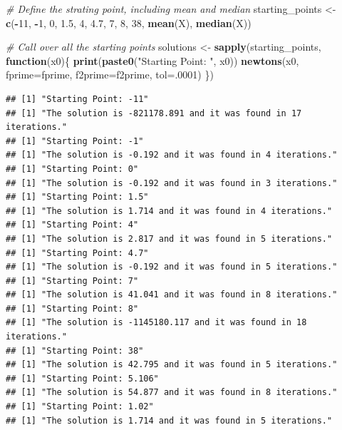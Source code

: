 \documentclass[]{article}
\newenvironment{Shaded}{\begin{snugshade}}{\end{snugshade}}
\newcommand{\KeywordTok}[1]{\textcolor[rgb]{0.13,0.29,0.53}{\textbf{#1}}}
\newcommand{\DataTypeTok}[1]{\textcolor[rgb]{0.13,0.29,0.53}{#1}}
\newcommand{\DecValTok}[1]{\textcolor[rgb]{0.00,0.00,0.81}{#1}}
\newcommand{\FloatTok}[1]{\textcolor[rgb]{0.00,0.00,0.81}{#1}}
\newcommand{\StringTok}[1]{\textcolor[rgb]{0.31,0.60,0.02}{#1}}
\newcommand{\CommentTok}[1]{\textcolor[rgb]{0.56,0.35,0.01}{\textit{#1}}}
\newcommand{\ControlFlowTok}[1]{\textcolor[rgb]{0.13,0.29,0.53}{\textbf{#1}}}
\newcommand{\OperatorTok}[1]{\textcolor[rgb]{0.81,0.36,0.00}{\textbf{#1}}}
\newcommand{\NormalTok}[1]{#1}
\begin{document}
\begin{Shaded}
\begin{Highlighting}[]
\CommentTok{# Define the strating point, including mean and median}
\NormalTok{starting_points <-}\StringTok{ }\KeywordTok{c}\NormalTok{(}\OperatorTok{-}\DecValTok{11}\NormalTok{, }\OperatorTok{-}\DecValTok{1}\NormalTok{, }\DecValTok{0}\NormalTok{, }\FloatTok{1.5}\NormalTok{, }\DecValTok{4}\NormalTok{, }\FloatTok{4.7}\NormalTok{, }\DecValTok{7}\NormalTok{, }\DecValTok{8}\NormalTok{, }\DecValTok{38}\NormalTok{, }\KeywordTok{mean}\NormalTok{(X), }\KeywordTok{median}\NormalTok{(X))}

\CommentTok{# Call over all the starting points}
\NormalTok{solutions <-}\StringTok{ }\KeywordTok{sapply}\NormalTok{(starting_points, }\ControlFlowTok{function}\NormalTok{(x0)\{}
  \KeywordTok{print}\NormalTok{(}\KeywordTok{paste0}\NormalTok{(}\StringTok{"Starting Point: "}\NormalTok{, x0))}
  \KeywordTok{newtons}\NormalTok{(x0, }\DataTypeTok{fprime=}\NormalTok{fprime, }\DataTypeTok{f2prime=}\NormalTok{f2prime, }\DataTypeTok{tol=}\NormalTok{.}\DecValTok{0001}\NormalTok{)}
\NormalTok{\})}
\end{Highlighting}
\end{Shaded}

\begin{verbatim}
## [1] "Starting Point: -11"
## [1] "The solution is -821178.891 and it was found in 17 iterations."
## [1] "Starting Point: -1"
## [1] "The solution is -0.192 and it was found in 4 iterations."
## [1] "Starting Point: 0"
## [1] "The solution is -0.192 and it was found in 3 iterations."
## [1] "Starting Point: 1.5"
## [1] "The solution is 1.714 and it was found in 4 iterations."
## [1] "Starting Point: 4"
## [1] "The solution is 2.817 and it was found in 5 iterations."
## [1] "Starting Point: 4.7"
## [1] "The solution is -0.192 and it was found in 5 iterations."
## [1] "Starting Point: 7"
## [1] "The solution is 41.041 and it was found in 8 iterations."
## [1] "Starting Point: 8"
## [1] "The solution is -1145180.117 and it was found in 18 iterations."
## [1] "Starting Point: 38"
## [1] "The solution is 42.795 and it was found in 5 iterations."
## [1] "Starting Point: 5.106"
## [1] "The solution is 54.877 and it was found in 8 iterations."
## [1] "Starting Point: 1.02"
## [1] "The solution is 1.714 and it was found in 5 iterations."
\end{verbatim}
\end{document}
